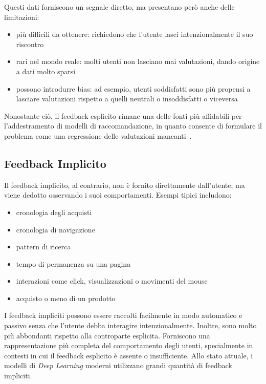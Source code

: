 Questi dati forniscono un segnale diretto, ma presentano però anche delle limitazioni:

\begin{itemize}
    \item più difficili da ottenere: richiedono che l'utente lasci intenzionalmente il suo riscontro
    \item rari nel mondo reale: molti utenti non lasciano mai valutazioni, dando origine a dati molto sparsi
    \item possono introdurre bias: ad esempio, utenti soddisfatti sono più propensi a lasciare valutazioni rispetto a quelli neutrali o insoddisfatti o viceversa
\end{itemize}

Nonostante ciò, il feedback esplicito rimane una delle fonti più affidabili per l'addestramento di modelli di raccomandazione, in quanto consente di formulare il problema come una regressione delle valutazioni mancanti~\cite{Implicit_feedback}.

\subsection{Feedback Implicito}

Il feedback implicito, al contrario, non è fornito direttamente dall'utente, ma viene dedotto osservando i suoi comportamenti. Esempi tipici includono:

\begin{itemize}
    \item cronologia degli acquisti
    \item cronologia di navigazione
    \item pattern di ricerca
    \item tempo di permanenza su una pagina
    \item interazioni come click, visualizzazioni o movimenti del mouse
    \item acquisto o meno di un prodotto
\end{itemize}

I feedback impliciti possono essere raccolti facilmente in modo automatico e passivo senza che l'utente debba interagire intenzionalmente. Inoltre, sono molto più abbondanti rispetto alla controparte esplicita. Forniscono una rappresentazione più completa del comportamento degli utenti, specialmente in contesti in cui il feedback esplicito è assente o insufficiente. Allo stato attuale, i modelli di \textit{Deep Learning} moderni utilizzano grandi quantità di feedback impliciti. 

